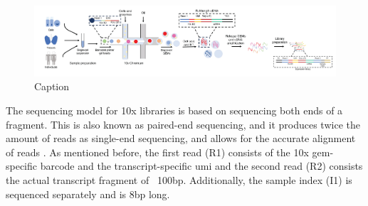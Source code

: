 \begin{figure}[H]
    \centering
    \includegraphics[width=\linewidth]{Chapter1/Fig/F1-5-03.png}
    \caption{Caption}
    \label{fig:chp1_scrna-3}
\end{figure}


The sequencing model for 10x libraries is based on sequencing both ends of a fragment. This is also known as paired-end sequencing, and it produces twice the amount of reads as single-end sequencing, and allows for the accurate alignment of reads \textbf{\cite{noauthor_paired-end_nodate}}. As mentioned before, the first read (R1) consists of the 10x \gls{gem}-specific barcode and the transcript-specific \gls{umi} and the second read (R2) consists the actual transcript fragment of ~100bp. Additionally, the sample index (I1) is sequenced separately and is 8bp long.



